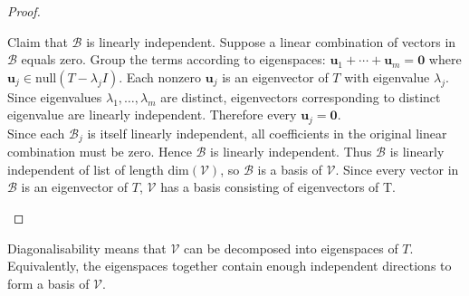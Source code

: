 \begin{proposition}
\begin{proof}
\begin{enumerate}[label=\roman*.]
Claim that $\mathcal{B}$ is linearly independent. Suppose a linear combination of vectors in $\mathcal{B}$ equals zero. Group the terms according to eigenspaces: $\mathbf{u}_1 + \cdots + \mathbf{u}_m = \mathbf{0}$ where $\mathbf{u}_j \in \text{null}(T - \lambda_j I)$. Each nonzero $\mathbf{u}_j$ is an eigenvector of $T$ with eigenvalue $\lambda_j$. Since eigenvalues $\lambda_1, \ldots, \lambda_m$ are distinct, eigenvectors corresponding to distinct eigenvalue are linearly independent. Therefore every $\mathbf{u}_j = \mathbf{0}$.\\
Since each $\mathcal{B}_j$ is itself linearly independent, all coefficients in the original linear combination must be zero. Hence $\mathcal{B}$ is linearly independent. Thus $\mathcal{B}$ is linearly independent of list of length $\text{dim}(\mathcal{V})$, so $\mathcal{B}$ is a basis of $\mathcal{V}$. Since every vector in $\mathcal{B}$ is an eigenvector of $T$, $\mathcal{V}$ has a basis consisting of eigenvectors of T.
\end{enumerate}
\end{proof}
\end{proposition}

Diagonalisability means that $\mathcal{V}$ can be decomposed into eigenspaces of $T$. Equivalently, the eigenspaces together contain enough independent directions to form a basis of $\mathcal{V}$.

